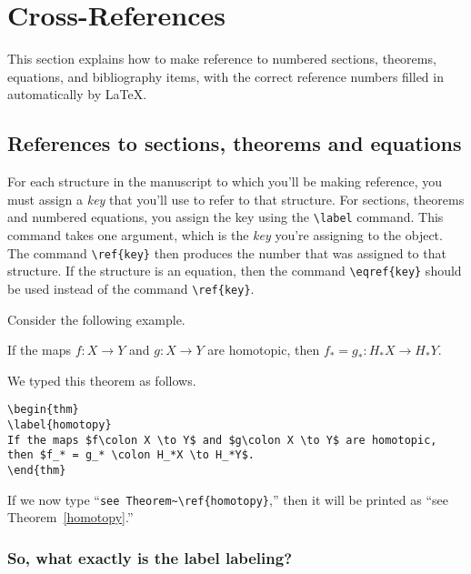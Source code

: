 \section{Cross-References}
\label{sec:xreferences}

This section explains how to make reference to numbered sections,
theorems, equations, and bibliography items, with the correct
reference numbers filled in automatically by \LaTeX.

\subsection{References to sections, theorems and equations}
\label{sec:thmrefs}

For each structure in the manuscript to which you'll be making
reference, you must assign a {\em key\/} that you'll use to refer to
that structure.  For sections, theorems and numbered equations, you assign
the key using the \verb"\label" command.  This command takes one
argument, which is the {\em key\/} you're assigning to the object.
The command \verb"\ref{key}" then produces the number that was
assigned to that structure.  If the structure is an equation, then
the command \verb"\eqref{key}" should be used instead of the command
\verb"\ref{key}".


Consider the following example.
\begin{thm}
\label{homotopy}
If the maps $f\colon X \to Y$ and $g\colon X \to Y$ are homotopic,
then $f_* = g_* \colon H_*X \to H_*Y$.
\end{thm}

We typed this theorem as follows.
\begin{verbatim}
\begin{thm}
\label{homotopy}
If the maps $f\colon X \to Y$ and $g\colon X \to Y$ are homotopic,
then $f_* = g_* \colon H_*X \to H_*Y$.
\end{thm}
\end{verbatim}
If we now type ``\verb"see Theorem~\ref{homotopy}",'' then it will be
printed as ``see Theorem~\ref{homotopy}.''





\subsubsection*{So, what exactly is the label labeling?}

